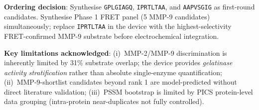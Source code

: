 \documentclass[10pt,a4paper]{article}
\newcommand{\seq}[1]{\texttt{#1}}
\begin{document}
\medskip
\noindent\textbf{Ordering decision}: Synthesise \seq{GPLGIAGQ}, \seq{IPRTLTAA},
and \seq{AAPVSGIG} as first-round candidates.  Synthesise Phase 1 FRET panel
(5 MMP-9 candidates) simultaneously; replace \seq{IPRTLTAA} in the device
with the highest-selectivity FRET-confirmed MMP-9 substrate before
electrochemical integration.

\medskip
\noindent\textbf{Key limitations acknowledged}:
(i)~MMP-2/MMP-9 discrimination is inherently limited by 31\% substrate
overlap; the device provides \emph{gelatinase activity stratification}
rather than absolute single-enzyme quantification;
(ii)~MMP-9-shortlist candidates beyond rank 1 are model-predicted without
direct literature validation;
(iii)~PSSM bootstrap is limited by PICS protein-level data grouping
(intra-protein near-duplicates not fully controlled).
\end{document}

